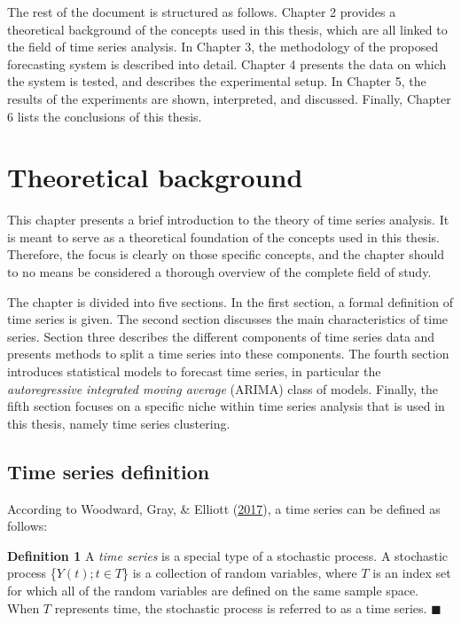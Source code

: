 \documentclass[12pt,oneside]{reedthesis}
\begin{document}
The rest of the document is structured as follows. Chapter 2 provides a
theoretical background of the concepts used in this thesis, which are
all linked to the field of time series analysis. In Chapter 3, the
methodology of the proposed forecasting system is described into detail.
Chapter 4 presents the data on which the system is tested, and describes
the experimental setup. In Chapter 5, the results of the experiments are
shown, interpreted, and discussed. Finally, Chapter 6 lists the
conclusions of this thesis.

\chapter{Theoretical background}\label{theoretical-background}

This chapter presents a brief introduction to the theory of time series
analysis. It is meant to serve as a theoretical foundation of the
concepts used in this thesis. Therefore, the focus is clearly on those
specific concepts, and the chapter should to no means be considered a
thorough overview of the complete field of study.

The chapter is divided into five sections. In the first section, a
formal definition of time series is given. The second section discusses
the main characteristics of time series. Section three describes the
different components of time series data and presents methods to split a
time series into these components. The fourth section introduces
statistical models to forecast time series, in particular the
\emph{autoregressive integrated moving average} (ARIMA) class of models.
Finally, the fifth section focuses on a specific niche within time
series analysis that is used in this thesis, namely time series
clustering.

\section{Time series definition}\label{time-series-definition}

According to Woodward, Gray, \& Elliott
(\protect\hyperlink{ref-woodward2017}{2017}), a time series can be
defined as follows:

\textbf{Definition 1} A \emph{time series} is a special type of a
stochastic process. A stochastic process \{\(Y(t); t \in T\)\} is a
collection of random variables, where \(T\) is an index set for which
all of the random variables are defined on the same sample space. When
\(T\) represents time, the stochastic process is referred to as a time
series. \(\blacksquare\)
\end{document}
